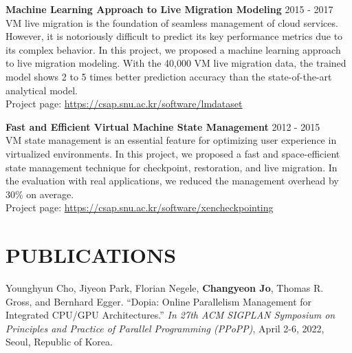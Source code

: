\documentclass[margin]{res}
\begin{document}
\begin{resume}
\par
\textbf{Machine Learning Approach to Live Migration Modeling} \hfill 2015 - 2017 \\
VM live migration is the foundation of seamless management of cloud services. However, it is notoriously difficult to predict its key performance metrics due to its complex behavior. In this project, we proposed a machine learning approach to live migration modeling. With the 40,000 VM live migration data, the trained model shows 2 to 5 times better prediction accuracy than the state-of-the-art analytical model.
\\
Project page: \href{https://csap.snu.ac.kr/software/lmdataset}{https://csap.snu.ac.kr/software/lmdataset}

\newpage
\par
\textbf{Fast and Efficient Virtual Machine State Management} \hfill 2012 - 2015 \\
VM state management is an essential feature for optimizing user experience in virtualized environments. In this project, we proposed a fast and space-efficient state management technique for checkpoint, restoration, and live migration. In the evaluation with real applications, we reduced the management overhead by 30\% on average. \\
Project page: \href{https://csap.snu.ac.kr/software/xencheckpointing}{https://csap.snu.ac.kr/software/xencheckpointing}


\section{PUBLICATIONS}
\par
Younghyun Cho, Jiyeon Park, Florian Negele, \textbf{Changyeon Jo}, Thomas R. Gross, and Bernhard Egger. ``Dopia: Online Parallelism Management for Integrated CPU/GPU Architectures.'' \textit{In 27th ACM SIGPLAN Symposium on Principles and Practice of Parallel Programming (PPoPP)}, April 2-6, 2022, Seoul, Republic of Korea.


\end{resume}
\end{document}
